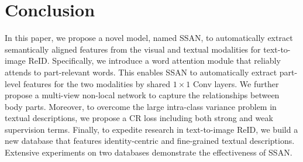 \documentclass[journal]{IEEEtran}
\begin{document}
\section{Conclusion} \label{Conclusion}
In this paper, we propose a novel model, named SSAN, to automatically extract semantically aligned features from the visual and textual modalities for text-to-image ReID. Specifically, we introduce a word attention module that reliably attends to part-relevant words. This enables SSAN to automatically extract part-level features for the two modalities by shared $1\times1$ Conv layers. We further propose a multi-view non-local network to capture the relationships between body parts. Moreover, to overcome the large intra-class variance problem in textual descriptions, we propose a CR loss including both strong and weak supervision terms. Finally, to expedite research in text-to-image ReID, we build a new database that features identity-centric and fine-grained textual descriptions. Extensive experiments on two databases demonstrate the effectiveness of SSAN.


















































\ifCLASSOPTIONcaptionsoff
  \newpage
\fi









\end{document}
